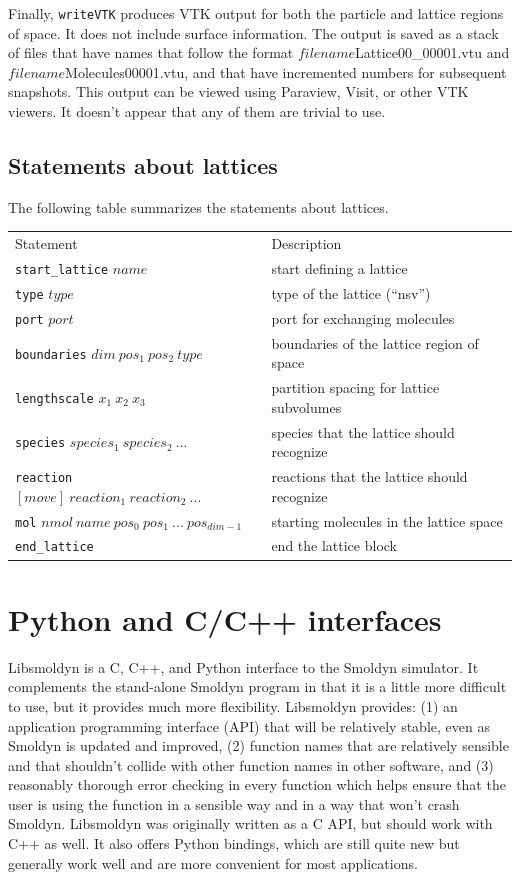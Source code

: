 \documentclass {scrbook}
\newcommand {\ttt} {\texttt}
\begin{document}
Finally, \ttt{writeVTK} produces VTK output for both the particle and lattice regions of space. It does not include surface information. The output is saved as a stack of files that have names that follow the format $filename$Lattice00\_00001.vtu and $filename$Molecules00001.vtu, and that have incremented numbers for subsequent snapshots. This output can be viewed using Paraview, Visit, or other VTK viewers. It doesn't appear that any of them are trivial to use.

\section{Statements about lattices}

The following table summarizes the statements about lattices.

\begin{longtable}[c]{ll}
Statement & Description\\
\ttt{start\_lattice} $name$ & start defining a lattice\\
\ttt{type} $type$ & type of the lattice (``nsv'')\\
\ttt{port} $port$ & port for exchanging molecules\\
\ttt{boundaries} $dim\ pos_1\ pos_2\ type$ & boundaries of the lattice region of space\\
\ttt{lengthscale} $x_1\ x_2\ x_3$ & partition spacing for lattice subvolumes\\
\ttt{species} $species_1\ species_2\ ...$ & species that the lattice should recognize\\
\ttt{reaction} $[move]\ reaction_1\ reaction_2\ ...$ & reactions that the lattice should recognize\\
\ttt{mol} $nmol\ name\ pos_0\ pos_1\ ...\ pos_{dim-1}$ & starting molecules in the lattice space\\
\ttt{end\_lattice} & end the lattice block
\end{longtable}


\chapter{Python and C/C++ interfaces}

Libsmoldyn is a C, C++, and Python interface to the Smoldyn simulator. It complements the stand-alone Smoldyn program in that it is a little more difficult to use, but it provides much more flexibility. Libsmoldyn provides: (1) an application programming interface (API) that will be relatively stable, even as Smoldyn is updated and improved, (2) function names that are relatively sensible and that shouldn't collide with other function names in other software, and (3) reasonably thorough error checking in every function which helps ensure that the user is using the function in a sensible way and in a way that won't crash Smoldyn. Libsmoldyn was originally written as a C API, but should work with C++ as well. It also offers Python bindings, which are still quite new but generally work well and are more convenient for most applications.
\end{document}
